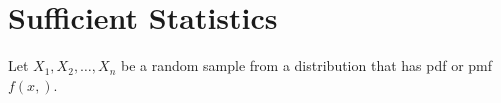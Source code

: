 \chapter{Sufficient Statistics}

\begin{defn}
Let $X_1, X_2, \ldots, X_n$ be a random sample from a distribution that has 
pdf or pmf $f(x, )$. 
\end{defn}